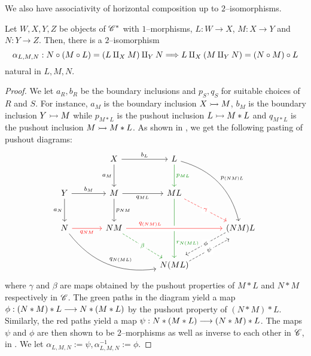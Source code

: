 \documentclass[./Thick_TQFTs_and_Quantum_Information.tex]{subfiles}
\begin{document}
We also have associativity of horizontal composition up to $2$--isomorphisms.
\begin{lem}
Let $W, X, Y, Z$ be objects of $\mathscr{C}^*$ with $1$--morphisms, $L : W \to X$,
$M : X \to Y$ and $N : Y \to Z$. Then, there is a $2$--isomorphism
\[
  \alpha_{L, M, N}
  : N \circ (M \circ L) = (L \amalg_X M) \amalg_Y N
  \stackrel{}{\Longrightarrow} L \amalg_X (M \amalg_Y N) = (N \circ M) \circ L
\]
natural in $L, M, N$.
\end{lem}
\begin{proof}
We let $a_R, b_R$ be the boundary inclusions and $p_S, q_S$ for suitable choices
of $R$ and $S$. For instance, $a_M$ is the boundary inclusion $X \stackrel{}{\rightarrowtail} M$,
$b_M$ is the boundary inclusion $Y \stackrel{}{\rightarrowtail} M$ while $p_{M * L}$ is the
pushout inclusion $L \stackrel{}{\rightarrowtail} M * L$ and $q_{M * L}$ is the pushout
inclusion $M \stackrel{}{\rightarrowtail} M * L$. As shown in \cite{Mahmud2021}, we get the
following pasting of pushout diagrams:
\begin{equation}\label{assoc1}
\begin{tikzcd}[column sep=large, row sep=large]
  & X \arrow[r, "b_{L}" above] \arrow[d, "a_{M}" left]
  & L \arrow[d, green!55!black, "p_{ML}" right]
      \arrow[rdd, bend left, "p_{(NM)L}"] \\
  Y \arrow[r, "b_{M}" above] \arrow[d, "a_{N}" left]
  & M \arrow[r, "q_{ML}" below] \arrow[d, "p_{NM}" right]
  & ML \arrow[dd, green!55!black, near end, "r_{N(ML)}"]
      \arrow[rd, dashed, red, "\gamma" description]\\
  N \arrow[r, red, "q_{NM}" below]
    \arrow[rrd, bend right, "q_{N(ML)}"]
  & NM
      \arrow[rr, near start, crossing over, red, "q_{(NM)L}"]
      \arrow[rd, dashed, green!55!black, "\beta" description]
  &
  & (NM)L
      \arrow[dl, dashed, shift right=1ex, "\phi" description] \\
  & & N(ML)
      \arrow[ur, dashed, shift right=1ex, "\psi" description] &
\end{tikzcd}
\end{equation}
where $\gamma$ and $\beta$ are maps obtained by the pushout properties of
$M * L$ and $N * M$ respectively in $\mathscr{C}$. The green paths in the diagram
yield a map $\phi : (N * M) * L \stackrel{}{\longrightarrow} N * (M * L)$ by the pushout property of
$(N * M) * L$. Similarly, the red paths yield a map
$\psi : N * (M * L) \stackrel{}{\longrightarrow} (N * M) * L$. The maps $\psi$ and $\phi$ are then shown
to be $2$--morphisms as well as inverse to each other in $\mathscr{C}$, in
\cite{Mahmud2021}. We let
$\alpha_{L, M, N} := \psi, \alpha^{-1}_{L, M, N} := \phi$.


\end{proof}
\end{document}
